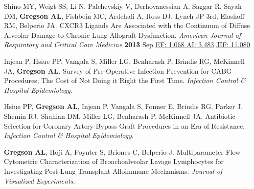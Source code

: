 \documentclass[12pt]{moderncv} %
\begin{document}
\begin{thebibliography}{1}
  \bibitem[23]{} Shino MY, Weigt SS, Li N, Palchevskiy V, Derhovanessian A, Saggar R, Sayah DM, \textbf{Gregson AL}, Fishbein MC, Ardehali A, Ross DJ, Lynch JP 3rd, Elashoff RM, Belperio JA. CXCR3 Ligands Are Associated with the Continuum of Diffuse Alveolar Damage to Chronic Lung Allograft Dysfunction. {\color{journalcolor}\textit{American Journal of Respiratory and Critical Care Medicine}} \textbf{2013} Sep
    {\color{subsectioncolor}\href{http://www.eigenfactor.org/rankings.php?bsearch=AMERICAN+JOURNAL+OF+RESPIRATORY+AND+CRITICAL+CARE+MEDICINE&searchby=journal&orderby=eigenfactor}{{\smaller EF: 1.068 AI: 3.483}}
      \href{http://admin-apps.webofknowledge.com/JCR/JCR?RQ=RECORD&rank=1&journal=AM+J+RESP+CRIT+CARE}{{\smaller JIF: 11.080}}
    }

\end{thebibliography}

\vspace{0.2cm}
\renewcommand{\refname}{Publications---Research Papers---Peer Reviewed ({\smaller in press})}

\begin{thebibliography}{1}
  \bibitem[1]{} Injean P, Hsiue PP, Vangala S, Miller LG, Benharash P, Brindis RG, McKinnell JA, \textbf{Gregson AL}. Survey of Pre-Operative Infection Prevention for {\smaller CABG} Procedures; The Cost of Not Doing it Right the First Time. {\color{journalcolor}\textit{Infection Control \& Hospital Epidemiology}}.

  \bibitem[2]{} Hsiue PP, \textbf{Gregson AL}, Injean P, Vangala S, Fonner E, Brindis RG, Parker J, Shemin RJ, Shahian DM, Miller LG, Benharash P, McKinnell JA. Antibiotic Selection for Coronary Artery Bypass Graft Procedures in an Era of Resistance. {\color{journalcolor}\textit{Infection Control \& Hospital Epidemiology}}.


\end{thebibliography}

\renewcommand{\refname}{Publications---Research Papers---Peer Reviewed ({\smaller Submitted})}
\begin{thebibliography}{1}
  \bibitem[1]{} \textbf{Gregson AL}, Hoji A, Poynter S, Briones C, Belperio J. Multiparameter Flow Cytometric Characterization of Bronchoalveolar Lavage Lymphocytes for Investigating Post-Lung Transplant Alloimmune Mechanisms. {\color{journalcolor}\textit{Journal of Visualized Experiments}}.

\end{thebibliography}
\end{document}
